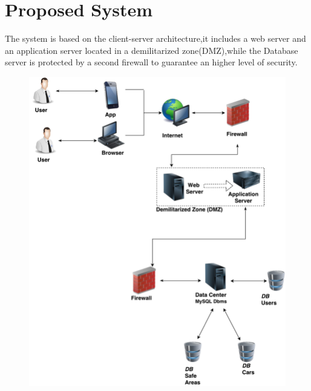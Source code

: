 \section{Proposed System}

The system is based on the client-server architecture,it includes a web server and an application server located in a demilitarized zone(DMZ),while the Database server is protected by a second firewall to guarantee an higher level of security.
\begin{figure}[p] 
\centering 
\includegraphics[scale=0.6]{introduction/resources/architecture} 
\end{figure}